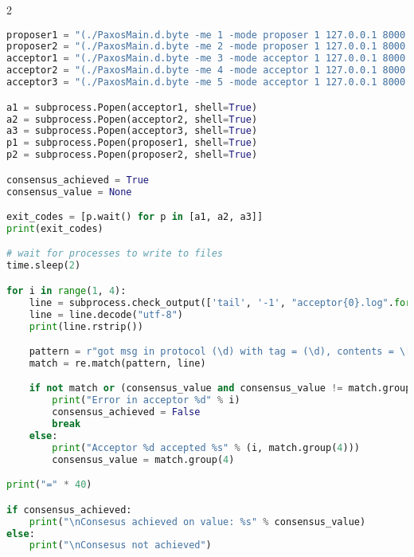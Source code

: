 \begin{landscape}
\begin{multicols*}{2}
\begin{lstlisting}[style=SourceCodeListing, language=Python]
proposer1 = "(./PaxosMain.d.byte -me 1 -mode proposer 1 127.0.0.1 8000 2 127.0.0.1 8001 3 127.0.0.1 8002 4 127.0.0.1 8003 5 127.0.0.1 8004 &) > proposer1.log 2>&1"
proposer2 = "(./PaxosMain.d.byte -me 2 -mode proposer 1 127.0.0.1 8000 2 127.0.0.1 8001 3 127.0.0.1 8002 4 127.0.0.1 8003 5 127.0.0.1 8004 &) > proposer2.log 2>&1"
acceptor1 = "(./PaxosMain.d.byte -me 3 -mode acceptor 1 127.0.0.1 8000 2 127.0.0.1 8001 3 127.0.0.1 8002 4 127.0.0.1 8003 5 127.0.0.1 8004 &) > acceptor1.log 2>&1"
acceptor2 = "(./PaxosMain.d.byte -me 4 -mode acceptor 1 127.0.0.1 8000 2 127.0.0.1 8001 3 127.0.0.1 8002 4 127.0.0.1 8003 5 127.0.0.1 8004 &) > acceptor2.log 2>&1"
acceptor3 = "(./PaxosMain.d.byte -me 5 -mode acceptor 1 127.0.0.1 8000 2 127.0.0.1 8001 3 127.0.0.1 8002 4 127.0.0.1 8003 5 127.0.0.1 8004 &) > acceptor3.log 2>&1"

a1 = subprocess.Popen(acceptor1, shell=True)
a2 = subprocess.Popen(acceptor2, shell=True)
a3 = subprocess.Popen(acceptor3, shell=True)
p1 = subprocess.Popen(proposer1, shell=True)
p2 = subprocess.Popen(proposer2, shell=True)

consensus_achieved = True
consensus_value = None

exit_codes = [p.wait() for p in [a1, a2, a3]]
print(exit_codes)

# wait for processes to write to files
time.sleep(2)

for i in range(1, 4):
    line = subprocess.check_output(['tail', '-1', "acceptor{0}.log".format(i)])
    line = line.decode("utf-8")
    print(line.rstrip())

    pattern = r"got msg in protocol (\d) with tag = (\d), contents = \[(\d); (\d)\]"
    match = re.match(pattern, line)

    if not match or (consensus_value and consensus_value != match.group(4)):
        print("Error in acceptor %d" % i)
        consensus_achieved = False
        break
    else:
        print("Acceptor %d accepted %s" % (i, match.group(4)))
        consensus_value = match.group(4)

print("=" * 40)

if consensus_achieved:
    print("\nConsesus achieved on value: %s" % consensus_value)
else:
    print("\nConsesus not achieved")
\end{lstlisting}

\end{multicols*}

\fi

\end{landscape}
\restoregeometry
